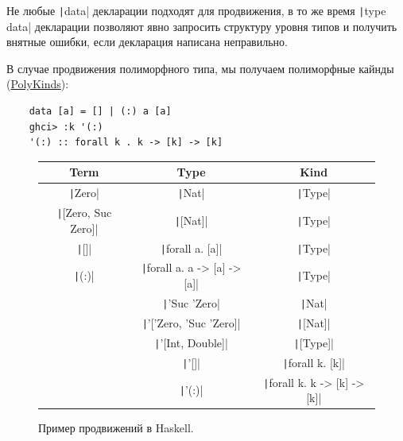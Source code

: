 Не любые \texttt|data| декларации подходят для продвижения, в то же время \texttt|type data| декларации позволяют явно запросить структуру уровня типов и получить внятные ошибки, если декларация написана неправильно.

В случае продвижения полиморфного типа, мы получаем полиморфные кайнды (\href{https://downloads.haskell.org/ghc/latest/docs/users_guide/exts/poly_kinds.html}{PolyKinds}):
\begin{verbatim}
    data [a] = [] | (:) a [a]
    ghci> :k '(:)
    '(:) :: forall k . k -> [k] -> [k]
\end{verbatim}

\begin{figure}[h]
    \centering
    \begin{tabular}{|c|c|c|}
        \hline
        Term                                   & Type                                            & Kind                                            \\
        \hline
        \texttt|Zero|             & \texttt|Nat|                       & \texttt|Type|                      \\
        \texttt|[Zero, Suc Zero]| & \texttt|[Nat]|                     & \texttt|Type|                      \\
        \texttt|[]|               & \texttt|forall a. [a]|             & \texttt|Type|                      \\
        \texttt|(:)|              & \texttt|forall a. a -> [a] -> [a]| & \texttt|Type|                      \\
        & \texttt|'Suc 'Zero|                & \texttt|Nat|                       \\
        & \texttt|'['Zero, 'Suc 'Zero]|      & \texttt|[Nat]|                     \\
        & \texttt|'[Int, Double]|            & \texttt|[Type]|                    \\
        & \texttt|'[]|                       & \texttt|forall k. [k]|             \\
        & \texttt|'(:)|                      & \texttt|forall k. k -> [k] -> [k]| \\
        \hline
    \end{tabular}
    \caption{Пример продвижений в Haskell.}
    \label{fig:universes}
\end{figure}

